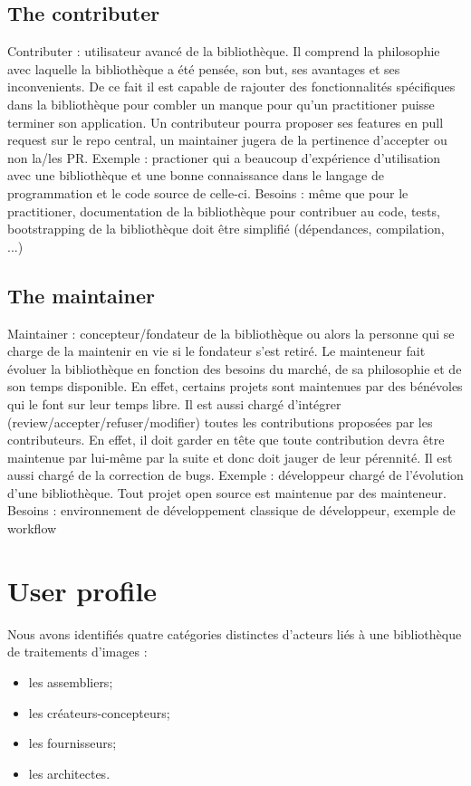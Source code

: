 \section{The contributer}



Contributer : utilisateur avancé de la bibliothèque. Il comprend la philosophie avec laquelle la bibliothèque a été
pensée, son but, ses avantages et ses inconvenients. De ce fait il est capable de rajouter des fonctionnalités
spécifiques dans la bibliothèque pour combler un manque pour qu'un practitioner puisse terminer son application. Un
contributeur pourra proposer ses features en pull request sur le repo central, un maintainer jugera de la pertinence
d'accepter ou non la/les PR. Exemple : practioner qui a beaucoup d'expérience d'utilisation avec une bibliothèque et une
bonne connaissance dans le langage de programmation et le code source de celle-ci. Besoins : même que pour le
practitioner, documentation de la bibliothèque pour contribuer au code, tests, bootstrapping de la bibliothèque doit
être simplifié (dépendances, compilation, ...)

\section{The maintainer}

Maintainer : concepteur/fondateur de la bibliothèque ou alors la personne qui se charge de la maintenir en vie si le
fondateur s'est retiré. Le mainteneur fait évoluer la bibliothèque en fonction des besoins du marché, de sa philosophie
et de son temps disponible. En effet, certains projets sont maintenues par des bénévoles qui le font sur leur temps
libre. Il est aussi chargé d'intégrer (review/accepter/refuser/modifier) toutes les contributions proposées par les
contributeurs. En effet, il doit garder en tête que toute contribution devra être maintenue par lui-même par la suite et
donc doit jauger de leur pérennité. Il est aussi chargé de la correction de bugs.
Exemple : développeur chargé de l'évolution d'une bibliothèque. Tout projet open source est maintenue par des mainteneur.
Besoins : environnement de développement classique de développeur, exemple de workflow



\chapter{User profile}

Nous avons identifiés quatre catégories distinctes d'acteurs liés à une bibliothèque de traitements
d'images :
\begin{itemize}
  \item les assembliers;
  \item les créateurs-concepteurs;
  \item les fournisseurs;
  \item les architectes.
\end{itemize}
